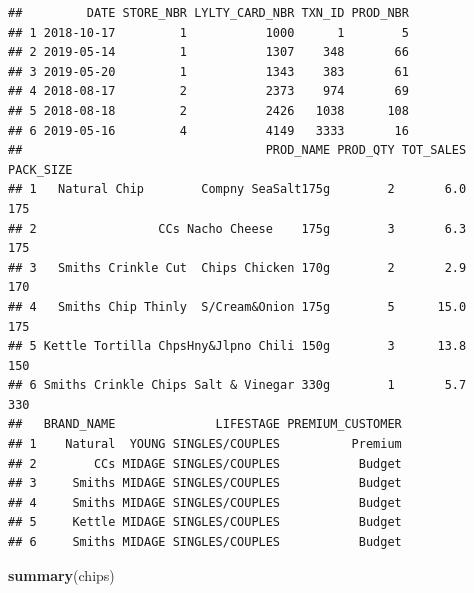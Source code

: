 \documentclass[
]{article}
\newenvironment{Shaded}{\begin{snugshade}}{\end{snugshade}}
\newcommand{\FunctionTok}[1]{\textcolor[rgb]{0.13,0.29,0.53}{\textbf{#1}}}
\newcommand{\NormalTok}[1]{#1}
\begin{document}
\begin{verbatim}
##         DATE STORE_NBR LYLTY_CARD_NBR TXN_ID PROD_NBR
## 1 2018-10-17         1           1000      1        5
## 2 2019-05-14         1           1307    348       66
## 3 2019-05-20         1           1343    383       61
## 4 2018-08-17         2           2373    974       69
## 5 2018-08-18         2           2426   1038      108
## 6 2019-05-16         4           4149   3333       16
##                                  PROD_NAME PROD_QTY TOT_SALES PACK_SIZE
## 1   Natural Chip        Compny SeaSalt175g        2       6.0       175
## 2                 CCs Nacho Cheese    175g        3       6.3       175
## 3   Smiths Crinkle Cut  Chips Chicken 170g        2       2.9       170
## 4   Smiths Chip Thinly  S/Cream&Onion 175g        5      15.0       175
## 5 Kettle Tortilla ChpsHny&Jlpno Chili 150g        3      13.8       150
## 6 Smiths Crinkle Chips Salt & Vinegar 330g        1       5.7       330
##   BRAND_NAME              LIFESTAGE PREMIUM_CUSTOMER
## 1    Natural  YOUNG SINGLES/COUPLES          Premium
## 2        CCs MIDAGE SINGLES/COUPLES           Budget
## 3     Smiths MIDAGE SINGLES/COUPLES           Budget
## 4     Smiths MIDAGE SINGLES/COUPLES           Budget
## 5     Kettle MIDAGE SINGLES/COUPLES           Budget
## 6     Smiths MIDAGE SINGLES/COUPLES           Budget
\end{verbatim}

\begin{Shaded}
\begin{Highlighting}[]
\FunctionTok{summary}\NormalTok{(chips)}
\end{Highlighting}
\end{Shaded}
\end{document}
